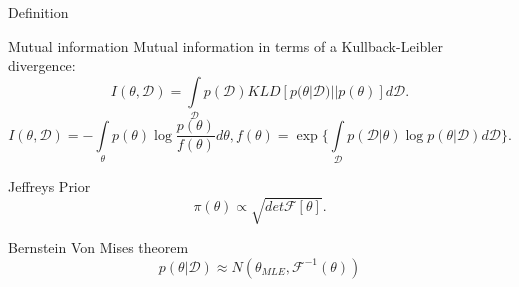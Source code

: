 \documentclass{beamer}
\begin{document}
\begin{frame}{Definition}
    \begin{block}{Mutual information}
    Mutual information in terms of a Kullback-Leibler divergence:
    \begin{equation}
        I(\theta, \mathcal{D}) = \int\limits_{\mathcal{D}} p(\mathcal{D}) KLD[p(\theta|\mathcal{D}) || p(\theta)] d\mathcal{D}.
    \end{equation} 
    \begin{equation}
        I(\theta, \mathcal{D}) = - \int\limits_{\theta} p(\theta) \log \frac{p(\theta)}{f(\theta)} d\theta,  
        f(\theta) = \exp\Big\{\int\limits_{\mathcal{D}} p(\mathcal{D}|\theta) \log p(\theta|\mathcal{D}) d\mathcal{D}\Big\}.
    \end{equation} 
    \end{block}
    \begin{block}{Jeffreys Prior}
    \begin{equation}
        \pi(\theta) \propto \sqrt{det \mathcal{F}[\theta]}.
    \end{equation} 
    \end{block}
    \begin{block}{Bernstein Von Mises theorem}
    \begin{equation}
    p(\theta|\mathcal{D}) \approx N(\theta_{MLE}, \mathcal{F}^{-1}(\theta))
    \end{equation} 
    \end{block}
    
\end{frame}
\end{document}
